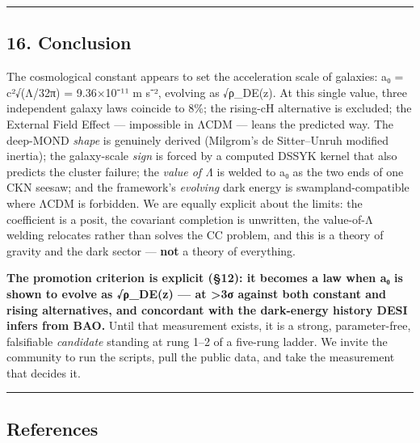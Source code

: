 \documentclass[
]{article}
\begin{document}
\begin{center}\rule{0.5\linewidth}{0.5pt}\end{center}

\subsection{16. Conclusion}\label{conclusion}

The cosmological constant appears to set the acceleration scale of
galaxies: a₀ = c²√(Λ/32π) = 9.36×10⁻¹¹ m s⁻², evolving as √ρ\_DE(z). At
this single value, three independent galaxy laws coincide to 8\%; the
rising-cH alternative is excluded; the External Field Effect ---
impossible in ΛCDM --- leans the predicted way. The deep-MOND
\emph{shape} is genuinely derived (Milgrom's de Sitter--Unruh modified
inertia); the galaxy-scale \emph{sign} is forced by a computed DSSYK
kernel that also predicts the cluster failure; the \emph{value of Λ} is
welded to a₀ as the two ends of one CKN seesaw; and the framework's
\emph{evolving} dark energy is swampland-compatible where ΛCDM is
forbidden. We are equally explicit about the limits: the coefficient is
a posit, the covariant completion is unwritten, the value-of-Λ welding
relocates rather than solves the CC problem, and this is a theory of
gravity and the dark sector --- \textbf{not} a theory of everything.

\textbf{The promotion criterion is explicit (§12): it becomes a law when
a₀ is shown to evolve as √ρ\_DE(z) --- at \textgreater3σ against both
constant and rising alternatives, and concordant with the dark-energy
history DESI infers from BAO.} Until that measurement exists, it is a
strong, parameter-free, falsifiable \emph{candidate} standing at rung
1--2 of a five-rung ladder. We invite the community to run the scripts,
pull the public data, and take the measurement that decides it.

\begin{center}\rule{0.5\linewidth}{0.5pt}\end{center}

\subsection{References}\label{references}
\end{document}
